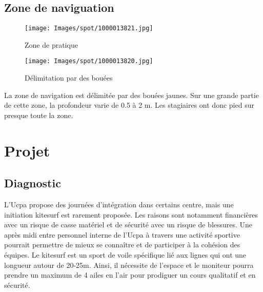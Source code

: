 \documentclass[11pt,a4paper]{report}
\begin{document}

\subsection{Zone de naviguation}
\begin{figure}
\begin{minipage}{0.4\textwidth}
\texttt{[image: Images/spot/1000013821.jpg]} 
\caption{Zone de pratique}
\end{minipage}
\hfill
\begin{minipage}{0.4\textwidth}
\texttt{[image: Images/spot/1000013820.jpg]} 
\caption{Délimitation par des bouées}
\end{minipage}
\end{figure}
La zone de navigation est délimitée par des bouées jaunes.
Sur une grande partie de cette zone, la profondeur varie de 0.5 à 2 m.
Les stagiaires ont donc pied sur presque toute la zone.
\section{Projet}
\subsection{Diagnostic}


L'Ucpa propose des journées d'intégration dans certains centre, mais
une initiation kitesurf est rarement proposée. Les raisons sont notamment
financières avec un risque de casse matériel et de sécurité avec un risque
de blessures.
Une après midi entre personnel interne de l'Ucpa à travers une 
activité sportive pourrait permettre  de mieux se connaître et de participer
à la cohésion des équipes.
Le kitesurf est un sport de voile spécifique lié aux lignes qui ont
une longueur autour de  20-25m. Ainsi, il nécessite de l'espace
et le moniteur pourra prendre un maximum de 4 ailes en l'air
pour prodiguer un cours qualitatif et en sécurité. 
\end{document}
